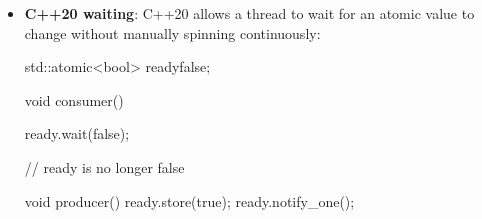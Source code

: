\documentclass{report}
\begin{document}
\begin{itemize}
\begin{cppcode}
                std::atomic<int*> pointer{values};

                pointer.fetch_add(1);  // Advances by one int
                int* current = pointer.load();
            \end{cppcode}
            \bigbreak \noindent 
            Atomic pointers are important in lock-free data structures, although safe memory reclamation makes those structures substantially more complicated than they initially appear.
        \item \textbf{C++20 waiting}: C++20 allows a thread to wait for an atomic value to change without manually spinning continuously:
            \bigbreak \noindent 
            \begin{cppcode}
            std::atomic<bool> ready{false};

            void consumer() {
                ready.wait(false);

                // ready is no longer false
            }

            void producer() {
                ready.store(true);
                ready.notify_one();
            }
            \end{cppcode}



    \end{itemize}
\end{document}

